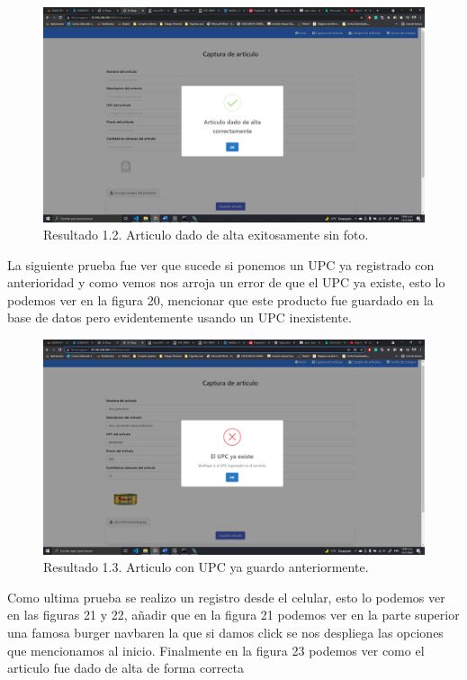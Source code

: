 \documentclass[11pt]{article}
\begin{document}
		\begin{figure}[H]
			\centering
			\includegraphics[scale=0.34]{resources/P1.1NF.png}
			\caption{Resultado 1.2. Articulo dado de alta exitosamente sin foto.}\label{fig:picture}
		\end{figure}
		La siguiente prueba fue ver que sucede si ponemos un UPC ya registrado con anterioridad y como vemos nos arroja un error de que el UPC ya existe, esto lo podemos ver en la figura 20, mencionar que este producto fue guardado en la base de datos pero evidentemente usando un UPC inexistente.
		\begin{figure}[H]
			\centering
			\includegraphics[scale=0.34]{resources/P1.ERROR.png}
			\caption{Resultado 1.3. Articulo con UPC ya guardo anteriormente.}\label{fig:picture}
		\end{figure}
		Como ultima prueba se realizo un registro desde el celular, esto lo podemos ver en las figuras 21 y 22, añadir que en la figura 21 podemos ver en la parte superior una famosa burger navbaren la que si damos click se nos despliega las opciones que mencionamos al inicio. Finalmente en la figura 23 podemos ver como el articulo fue dado de alta de forma correcta
\end{document}
